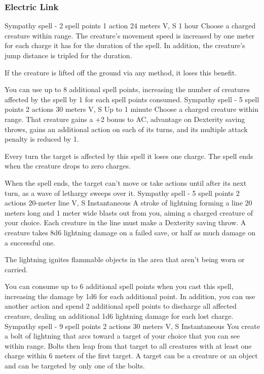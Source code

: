 \subsubsection{Electric Link}
        {Sympathy spell - 2 spell points}
        {1 action}
        {24 meters}
        {V, S}
        {1 hour}
        Choose a charged creature within range.
        The creature's movement speed is increased by one meter for each charge it has for the duration of the spell.
        In addition, the creature's jump distance is tripled for the duration.

        If the creature is lifted off the ground via any method, it loses this benefit.

        You can use up to 8 additional spell points, increasing the number of creatures affected by the spell by 1 for each spell points consumed.
        {Sympathy spell - 5 spell points}
        {2 actions}
        {30 meters}
        {V, S}
        {Up to 1 minute}
        Choose a charged creature within range.
        That creature gains a +2 bonus to AC, advantage on Dexterity saving throws, gains an additional action on each of its turns, and its multiple attack penalty is reduced by 1.

        Every turn the target is affected by this spell it loses one charge.
        The spell ends when the creature drops to zero charges.

        When the spell ends, the target can't move or take actions until after its next turn, as a wave of lethargy sweeps over it.
        {Sympathy spell - 5 spell points}
        {2 actions}
        {20-meter line}
        {V, S}
        {Instantaneous}
        A stroke of lightning forming a line 20 meters long and 1 meter wide blasts out from you, aiming a charged creature of your choice.
        Each creature in the line must make a Dexterity saving throw.
        A creature takes 8d6 lightning damage on a failed save, or half as much damage on a successful one.

        The lightning ignites flammable objects in the area that aren't being worn or carried.

        You can consume up to 6 additional spell points when you cast this spell, increasing the damage by 1d6 for each additional point.
        In addition, you can use another action and spend 2 additional spell points to discharge all affected creature, dealing an additional 1d6 lightning damage for each lost charge.
        {Sympathy spell - 9 spell points}
        {2 actions}
        {30 meters}
        {V, S}
        {Instantaneous}
        You create a bolt of lightning that arcs toward a target of your choice that you can see within range.
        Bolts then leap from that target to all creatures with at least one charge within 6 meters of the first target.
        A target can be a creature or an object and can be targeted by only one of the bolts.

